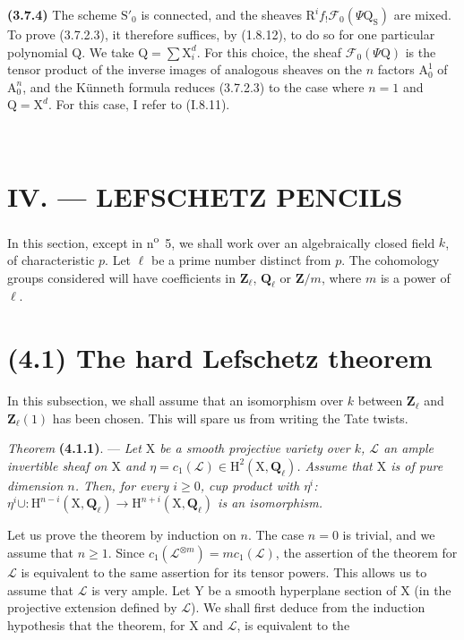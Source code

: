 \documentclass[11pt,leqno]{article}
\newcommand{\Page}[1]{\ifvmode\noindent\else\unskip\ \fi{\footnotesize\textcolor{gray}{[p.\,#1]}}\ \ignorespaces}
\begin{document}
\textbf{(3.7.4)} The scheme \(\mathrm S'_0\) is connected, and the sheaves \(\mathrm R^if_!\mathscr F_0(\Psi\mathrm Q_{\mathrm S})\) are mixed. To prove (3.7.2.3), it therefore suffices, by (1.8.12), to do so for one particular polynomial \(\mathrm Q\). We take \(\mathrm Q=\sum\mathrm X_i^d\). For this choice, the sheaf \(\mathscr F_0(\Psi\mathrm Q)\) is the tensor product of the inverse images of analogous sheaves on the \(n\) factors \(\mathrm A_0^1\) of \(\mathrm A_0^n\), and the Künneth formula reduces (3.7.2.3) to the case where \(n=1\) and \(\mathrm Q=\mathrm X^d\). For this case, I refer to (I.8.11).

\Page{217}
\section*{IV. — LEFSCHETZ PENCILS}

In this section, except in n\textsuperscript{o}~5, we shall work over an algebraically closed field \(k\), of characteristic \(p\). Let \(\ell\) be a prime number distinct from \(p\). The cohomology groups considered will have coefficients in \(\mathbf{Z}_\ell\), \(\mathbf{Q}_\ell\) or \(\mathbf{Z}/m\), where \(m\) is a power of \(\ell\).

\section*{(4.1) The hard Lefschetz theorem}

In this subsection, we shall assume that an isomorphism over \(k\) between \(\mathbf{Z}_\ell\) and \(\mathbf{Z}_\ell(1)\) has been chosen. This will spare us from writing the Tate twists.

\textit{Theorem} \textbf{(4.1.1)}. — \textit{Let \(\mathrm{X}\) be a smooth projective variety over \(k\), \(\mathscr{L}\) an ample invertible sheaf on \(\mathrm{X}\) and \(\eta=c_1(\mathscr{L})\in\mathrm{H}^2(\mathrm{X},\mathbf{Q}_\ell)\). Assume that \(\mathrm{X}\) is of pure dimension \(n\). Then, for every \(i\geq0\), cup product with \(\eta^i\): \(\eta^i\cup:\mathrm{H}^{n-i}(\mathrm{X},\mathbf{Q}_\ell)\to\mathrm{H}^{n+i}(\mathrm{X},\mathbf{Q}_\ell)\) is an isomorphism.}

Let us prove the theorem by induction on \(n\). The case \(n=0\) is trivial, and we assume that \(n\geq1\). Since \(c_1(\mathscr{L}^{\otimes m})=mc_1(\mathscr{L})\), the assertion of the theorem for \(\mathscr{L}\) is equivalent to the same assertion for its tensor powers. This allows us to assume that \(\mathscr{L}\) is very ample. Let \(\mathrm{Y}\) be a smooth hyperplane section of \(\mathrm{X}\) (in the projective extension defined by \(\mathscr{L}\)). We shall first deduce from the induction hypothesis that the theorem, for \(\mathrm{X}\) and \(\mathscr{L}\), is equivalent to the
\end{document}
